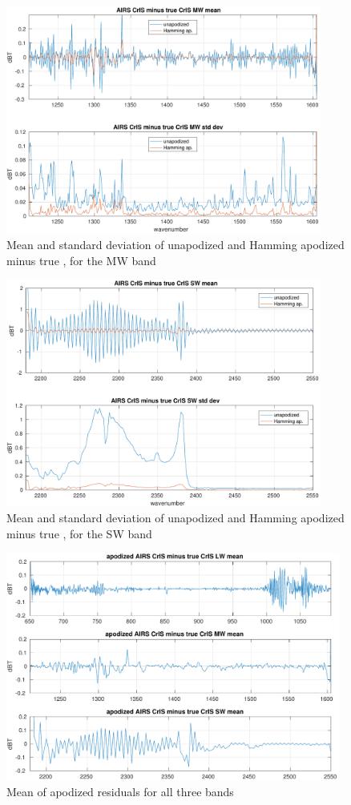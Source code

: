 \documentclass[11pt]{article}
\begin{document}
\begin{figure} %
  \centering
  \includegraphics[height=7.5cm]{figures/a2cris_diff_MW.pdf}
  \caption{Mean and standard deviation of unapodized and Hamming
    apodized {\airs} {\cris} minus true {\cris}, for the {\cris} MW
    band}
  \label{diffMW}
\end{figure}

\begin{figure} %
  \centering
  \includegraphics[height=7.5cm]{figures/a2cris_diff_SW.pdf}
  \caption{Mean and standard deviation of unapodized and Hamming
    apodized {\airs} {\cris} minus true {\cris}, for the {\cris} SW
    band}
  \label{diffSW}
\end{figure}

\begin{figure} %
  \centering
  \includegraphics[height=7.5cm]{figures/a2cris_diff_all.pdf}
  \caption{Mean of apodized residuals for all three {\cris} bands}
  \label{meanAll}
\end{figure}
\end{document}
